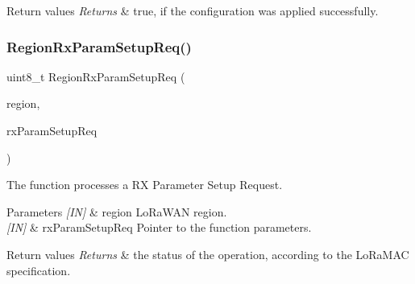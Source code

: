 \begin{DoxyRetVals}{Return values}
{\em Returns} & true, if the configuration was applied successfully. \\
\hline
\end{DoxyRetVals}
\mbox{\label{group__REGION_ga485a820155fded42235a0d14d5918a7d}} 
\subsubsection{\texorpdfstring{Region\+Rx\+Param\+Setup\+Req()}{RegionRxParamSetupReq()}}
{\footnotesize\ttfamily uint8\+\_\+t Region\+Rx\+Param\+Setup\+Req (\begin{DoxyParamCaption}\item[{\hyperlink{group__LORAMAC_ga80c48efda9ae02e14b58160d34a798dd}{Lo\+Ra\+Mac\+Region\+\_\+t}}]{region,  }\item[{\hyperlink{group__REGION_ga7165f282c670c728c36d534df2285157}{Rx\+Param\+Setup\+Req\+Params\+\_\+t} $\ast$}]{rx\+Param\+Setup\+Req }\end{DoxyParamCaption})}



The function processes a RX Parameter Setup Request. 


\begin{DoxyParams}{Parameters}
{\em \mbox{[}\+I\+N\mbox{]}} & region Lo\+Ra\+W\+AN region.\\
\hline
{\em \mbox{[}\+I\+N\mbox{]}} & rx\+Param\+Setup\+Req Pointer to the function parameters.\\
\hline
\end{DoxyParams}

\begin{DoxyRetVals}{Return values}
{\em Returns} & the status of the operation, according to the Lo\+Ra\+M\+AC specification. \\
\hline
\end{DoxyRetVals}
\mbox{\label{group__REGION_gabdd176dcf0b7e7900377b4c1e183613d}} 

